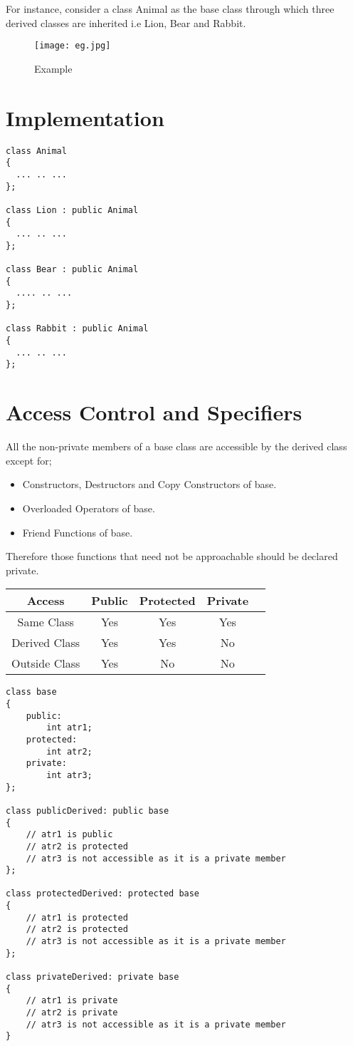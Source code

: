 \documentclass[11pt,fleqn]{book} %
\begin{document}
For instance, consider a class Animal as the base class through which three derived classes are inherited i.e Lion, Bear and Rabbit.

\begin{figure}[h]
	\centering\texttt{[image: eg.jpg]}
	\caption{Example}
\end{figure}
\hfill

\newpage
\section{Implementation}
\begin{lstlisting}
class Animal 
{
  ... .. ...
};

class Lion : public Animal
{
  ... .. ...
};

class Bear : public Animal
{
  .... .. ...
};

class Rabbit : public Animal 
{
  ... .. ...
};
\end{lstlisting}
\hfill 
\section{Access Control and Specifiers}
 All the non-private members of a base class are accessible by the derived class except for;
 
 \begin{itemize}
 \item Constructors, Destructors and Copy Constructors of base.
 \item Overloaded Operators of base.
 \item Friend Functions of base.
 \end{itemize}
 Therefore those functions that need not be approachable should be declared private.

\begin{center}
\begin{tabular}{ |c|c|c|c|c| } 
\hline
Access & Public & Protected & Private \\
\hline
Same Class & Yes & Yes & Yes \\ 
Derived Class & Yes & Yes & No \\ 
Outside Class & Yes & No & No \\ 
\hline
\end{tabular}
\end{center}
\begin{lstlisting}
class base 
{
	public:
		int atr1;
	protected:
		int atr2;
	private:
		int atr3;
};

class publicDerived: public base
{
	// atr1 is public
	// atr2 is protected
	// atr3 is not accessible as it is a private member
};

class protectedDerived: protected base
{
	// atr1 is protected
	// atr2 is protected
	// atr3 is not accessible as it is a private member
};

class privateDerived: private base
{
	// atr1 is private
	// atr2 is private
	// atr3 is not accessible as it is a private member 
}
\end{lstlisting}
\end{document}
